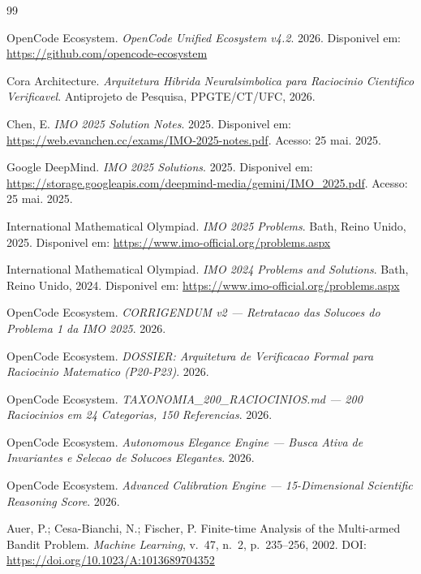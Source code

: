 \documentclass[5p]{elsarticle}
\begin{document}
\begin{thebibliography}{99}

OpenCode Ecosystem. \textit{OpenCode Unified Ecosystem v4.2}. 2026. Disponivel em: \url{https://github.com/opencode-ecosystem}

Cora Architecture. \textit{Arquitetura Hibrida Neuralsimbolica para Raciocinio Cientifico Verificavel}. Antiprojeto de Pesquisa, PPGTE/CT/UFC, 2026.

Chen, E. \textit{IMO 2025 Solution Notes}. 2025. Disponivel em: \url{https://web.evanchen.cc/exams/IMO-2025-notes.pdf}. Acesso: 25 mai. 2025.

Google DeepMind. \textit{IMO 2025 Solutions}. 2025. Disponivel em: \url{https://storage.googleapis.com/deepmind-media/gemini/IMO_2025.pdf}. Acesso: 25 mai. 2025.

International Mathematical Olympiad. \textit{IMO 2025 Problems}. Bath, Reino Unido, 2025. Disponivel em: \url{https://www.imo-official.org/problems.aspx}

International Mathematical Olympiad. \textit{IMO 2024 Problems and Solutions}. Bath, Reino Unido, 2024. Disponivel em: \url{https://www.imo-official.org/problems.aspx}

OpenCode Ecosystem. \textit{CORRIGENDUM v2 --- Retratacao das Solucoes do Problema 1 da IMO 2025}. 2026.

OpenCode Ecosystem. \textit{DOSSIER: Arquitetura de Verificacao Formal para Raciocinio Matematico (P20-P23)}. 2026.

OpenCode Ecosystem. \textit{TAXONOMIA\_200\_RACIOCINIOS.md --- 200 Raciocinios em 24 Categorias, 150 Referencias}. 2026.

OpenCode Ecosystem. \textit{Autonomous Elegance Engine --- Busca Ativa de Invariantes e Selecao de Solucoes Elegantes}. 2026.

OpenCode Ecosystem. \textit{Advanced Calibration Engine --- 15-Dimensional Scientific Reasoning Score}. 2026.

Auer, P.; Cesa-Bianchi, N.; Fischer, P. Finite-time Analysis of the Multi-armed Bandit Problem. \textit{Machine Learning}, v.~47, n.~2, p.~235--256, 2002. DOI: \url{https://doi.org/10.1023/A:1013689704352}


\end{thebibliography}
\end{document}
